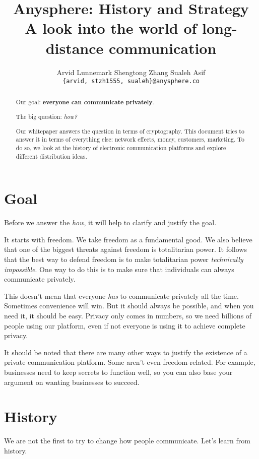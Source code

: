 \documentclass[sigconf, nonacm, balance=false, natbib=false]{acmart}
\title{\textbf{Anysphere: History and Strategy} \\ \vspace{0.4cm} {\huge \normalfont A look into the world of long-distance communication}}
\date{\dateinfo}
\author{Arvid Lunnemark \hspace{0.7cm} Shengtong Zhang \hspace{0.7cm} Sualeh Asif \\ \vspace{0.1cm} \nolinkurl{{arvid, stzh1555, sualeh}@anysphere.co} \\ \vspace{0.4cm} \dateinfo}
\begin{document}
\pagecolor{pagecolor}

\begin{abstract}
    Our goal: \textbf{everyone can communicate privately}.

    The big question: \textit{how?}

    Our whitepaper answers the question in terms of cryptography. This document tries to answer it in terms of everything else: network effects, money, customers, marketing. To do so, we look at the history of electronic communication platforms and explore different distribution ideas.
\end{abstract}

\maketitle

\tableofcontents

\section{Goal}

Before we answer the \textit{how}, it will help to clarify and justify the goal.

It starts with freedom. We take freedom as a fundamental good. We also believe that one of the biggest threats against freedom is totalitarian power. It follows that the best way to defend freedom is to make totalitarian power \textit{technically impossible}. One way to do this is to make sure that individuals can always communicate privately.

This doesn't mean that everyone \textit{has} to communicate privately all the time. Sometimes convenience will win. But it should always be possible, and when you need it, it should be easy. Privacy only comes in numbers, so we need billions of people using our platform, even if not everyone is using it to achieve complete privacy.

It should be noted that there are many other ways to justify the existence of a private communication platform. Some aren't even freedom-related. For example, businesses need to keep secrets to function well, so you can also base your argument on wanting businesses to succeed.

\section{History}

We are not the first to try to change how people communicate. Let's learn from history.
\end{document}
